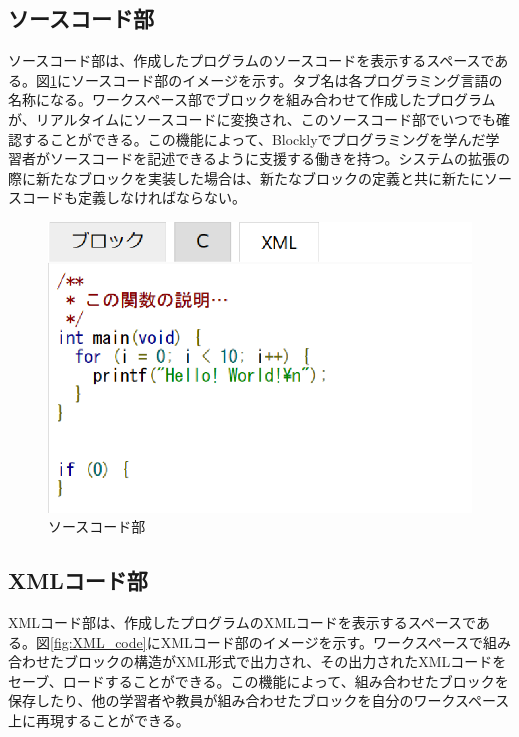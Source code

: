 \documentclass{eniepaper}
\begin{document}
   \subsection{ソースコード部}
   
ソースコード部は、作成したプログラムのソースコードを表示するスペースである。図\ref{fig:source_code}にソースコード部のイメージを示す。タブ名は各プログラミング言語の名称になる。ワークスペース部でブロックを組み合わせて作成したプログラムが、リアルタイムにソースコードに変換され、このソースコード部でいつでも確認することができる。この機能によって、Blocklyでプログラミングを学んだ学習者がソースコードを記述できるように支援する働きを持つ。システムの拡張の際に新たなブロックを実装した場合は、新たなブロックの定義と共に新たにソースコードも定義しなければならない。

\begin{figure}[h]
\begin{center}
\includegraphics[scale=0.3]{img/source_code.eps}
\caption{ソースコード部}%
\label{fig:source_code}
\end{center}%
\end{figure}%

   \subsection{XMLコード部}
   
XMLコード部は、作成したプログラムのXMLコードを表示するスペースである。図\ref{fig:XML_code}にXMLコード部のイメージを示す。ワークスペースで組み合わせたブロックの構造がXML形式で出力され、その出力されたXMLコードをセーブ、ロードすることができる。この機能によって、組み合わせたブロックを保存したり、他の学習者や教員が組み合わせたブロックを自分のワークスペース上に再現することができる。
\end{document}
